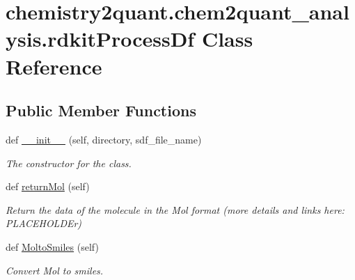 \hypertarget{classchemistry2quant_1_1chem2quant__analysis_1_1rdkitProcessDf}{}\section{chemistry2quant.\+chem2quant\+\_\+analysis.\+rdkit\+Process\+Df Class Reference}
\label{classchemistry2quant_1_1chem2quant__analysis_1_1rdkitProcessDf}
\subsection*{Public Member Functions}
\begin{DoxyCompactItemize}
\item
\mbox{\label{classchemistry2quant_1_1chem2quant__analysis_1_1rdkitProcessDf_a3f2db3306c1c8c1883cf3af811c539bf}}
def \hyperlink{classchemistry2quant_1_1chem2quant__analysis_1_1rdkitProcessDf_a3f2db3306c1c8c1883cf3af811c539bf}{\+\_\+\+\_\+init\+\_\+\+\_\+} (self, directory, sdf\+\_\+file\+\_\+name)
\begin{DoxyCompactList}\small\item\em The constructor for the class. \end{DoxyCompactList}\item
\mbox{\label{classchemistry2quant_1_1chem2quant__analysis_1_1rdkitProcessDf_a63adf77432f5f20cb2e80f8860f67c79}}
def \hyperlink{classchemistry2quant_1_1chem2quant__analysis_1_1rdkitProcessDf_a63adf77432f5f20cb2e80f8860f67c79}{return\+Mol} (self)
\begin{DoxyCompactList}\small\item\em Return the data of the molecule in the Mol format (more details and links here\+: P\+L\+A\+C\+E\+H\+O\+L\+D\+Er) \end{DoxyCompactList}\item
\mbox{\label{classchemistry2quant_1_1chem2quant__analysis_1_1rdkitProcessDf_a201597882ae98a081f023159382c7d05}}
def \hyperlink{classchemistry2quant_1_1chem2quant__analysis_1_1rdkitProcessDf_a201597882ae98a081f023159382c7d05}{Molto\+Smiles} (self)
\begin{DoxyCompactList}\small\item\em Convert Mol to smiles. \end{DoxyCompactList}\item

\end{DoxyCompactItemize}
